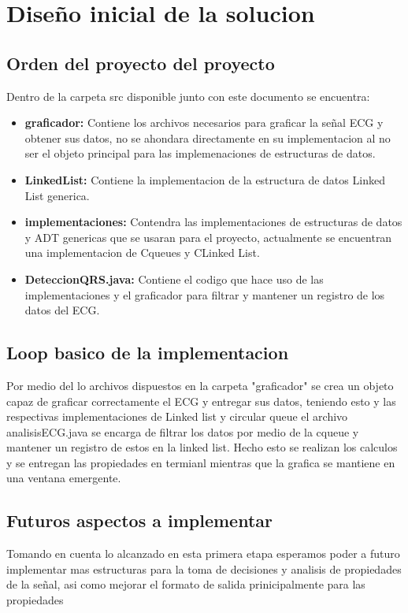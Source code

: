 \section{Diseño inicial de la solucion}
\label{sec:diseño}

\subsection{Orden del proyecto del proyecto}
Dentro de la carpeta src disponible junto con este documento se encuentra:
\begin{itemize}
    \item \textbf{graficador:} Contiene los archivos necesarios para graficar la señal ECG y obtener sus datos, no se ahondara directamente en su implementacion al no ser el objeto principal para las implemenaciones de estructuras de datos.
    \item \textbf{LinkedList:} Contiene la implementacion de la estructura de datos Linked List generica.
    \item \textbf{implementaciones:} Contendra las implementaciones de estructuras de datos y ADT genericas que se usaran para el proyecto, actualmente se encuentran una implementacion de Cqueues y CLinked List.
    \item \textbf{DeteccionQRS.java:} Contiene el codigo que hace uso de las implementaciones y el graficador para filtrar y mantener un registro de los datos del ECG.
\end{itemize}

\subsection{Loop basico de la implementacion}
Por medio del lo archivos dispuestos en la carpeta "graficador" se crea un objeto capaz de graficar correctamente el ECG y entregar sus datos, teniendo esto y las respectivas implementaciones de Linked list y circular queue el archivo analisisECG.java se encarga de filtrar los datos por medio de la cqueue
y mantener un registro de estos en la linked list. Hecho esto se realizan los calculos y se entregan las propiedades en termianl mientras que la grafica se mantiene en una ventana emergente.

\subsection{Futuros aspectos a implementar}
Tomando en cuenta lo alcanzado en esta primera etapa esperamos poder a futuro implementar mas estructuras para la toma de decisiones y analisis de propiedades de la señal, asi como mejorar el formato de salida prinicipalmente para las propiedades
